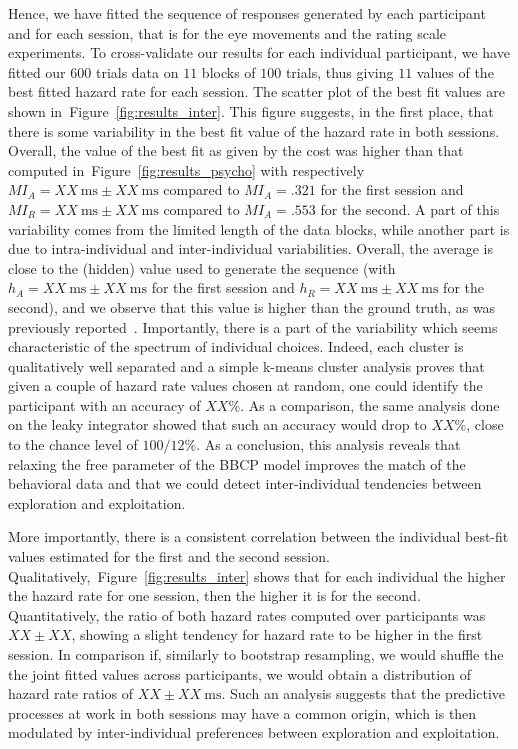\documentclass[12pt,english]{article}%
\newcommand{\ms}{\si{\milli\second}}%
\newcommand{\citep}[1]{\parencite{#1}}
\newcommand{\seeFig}[1]{Figure~\ref{fig:#1}}
\begin{document}
Hence, we have fitted the sequence of responses generated by each participant and
for each session, that is for the eye movements and the rating scale experiments.
To cross-validate our results for each individual participant, 
we have fitted our $600$ trials data on $11$ blocks of $100$ trials, 
thus giving $11$ values of the best fitted hazard rate for each session.
The scatter plot of the best fit values are shown in~\seeFig{results_inter}.
This figure suggests, in the first place, that there is some variability 
in the best fit value of the hazard rate in both sessions.
Overall, the value of the best fit as given by the cost 
was higher than that computed in~\seeFig{results_psycho}
with respectively $MI_A = XX~\ms \pm XX~\ms$ compared to $MI_A = .321$ for the first session and
$MI_R = XX~\ms \pm XX~\ms$ compared to $MI_A = .553$ for the second.
A part of this variability comes from the limited length of the data blocks,
while another part is due to intra-individual and inter-individual variabilities.
Overall, the average is close to the (hidden) value used to generate the sequence
(with $h_A = XX~\ms \pm XX~\ms$ for the first session and
$h_R = XX~\ms \pm XX~\ms$ for the second),
and we observe that this value is higher than the ground truth, 
as was previously reported~\citep{Meyniel??}.
Importantly, there is a part of the variability 
which seems characteristic of the spectrum of individual choices.
Indeed, each cluster is qualitatively well separated and
a simple k-means cluster analysis proves that 
given a couple of hazard rate values chosen at random,
one could identify the participant with an accuracy of $XX\%$.
As a comparison, the same analysis done on the leaky integrator
showed that such an accuracy would drop to $XX\%$, 
close to the chance level of $100/12\%$.
As a conclusion, this analysis reveals 
that relaxing the free parameter of the BBCP model
improves the match of the behavioral data and 
that we could detect inter-individual tendencies
between exploration and exploitation.

More importantly, there is a  consistent
correlation between the individual best-fit values estimated for the first and the second session.
Qualitatively,~\seeFig{results_inter} shows that for each individual the higher the hazard rate for one session, then the higher it is for the second.
Quantitatively, the ratio of both hazard rates computed over participants was $XX \pm XX$,
showing a slight tendency for hazard rate to be higher in the first session.
In comparison if, similarly to bootstrap resampling, 
we would shuffle the the joint fitted values across participants,
we would obtain a distribution of hazard rate ratios of $XX \pm XX~\ms$.
Such an analysis suggests that the predictive processes
at work in both sessions may have a common origin,
which is then modulated by inter-individual preferences 
between exploration and exploitation.
\end{document}
